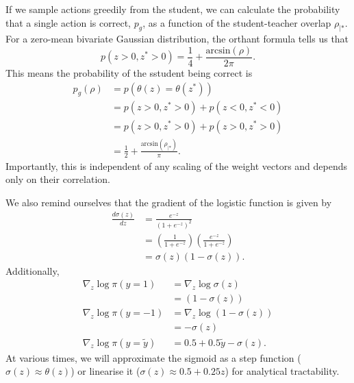 \documentclass{article}
\begin{document}
If we sample actions greedily from the student, we can calculate the probability that a single action is correct, $p_g$, as a function of the student-teacher overlap $\rho_{| *}$.
For a zero-mean bivariate Gaussian distribution, the orthant formula tells us that
\begin{equation}
    p(z >0, z^* > 0) = \frac{1}{4} + \frac{\text{arcsin}(\rho)}{2 \pi}.
\end{equation}
This means the probability of the sstudent being correct is
\begin{align}
    p_g(\rho) &= p(\theta(z) = \theta(z^*))\\
    &= p(z >0, z^* > 0) + p(z < 0, z^* < 0)\\
    &= p(z >0, z^* > 0) + p(z >0, z^* > 0)\\
    &= \frac{1}{2} + \frac{\text{arcsin}(\rho_{|*})}{\pi}. \label{eq:pg}
\end{align}
Importantly, this is independent of any scaling of the weight vectors and depends only on their correlation.

We also remind ourselves that the gradient of the logistic function is given by
\begin{align}
    \frac{d \sigma (z)}{dz} &= \frac{e^{-z}}{(1 + e^{-z})^2}\\
    &= \left ( \frac{1}{1 + e^{-z}} \right ) \left ( \frac{e^{-z}}{1 + e^{-z}} \right ) \\
    &= \sigma(z) (1 - \sigma(z)).
\end{align}
Additionally,
\begin{align}
    \nabla_z \log \pi(y = 1) &= \nabla_z \log \sigma(z)\\
    &= (1 - \sigma (z))\\
    \nabla_z \log \pi (y = -1) &= \nabla_z \log (1 - \sigma(z))\\
    &= - \sigma (z)\\
    \nabla_z \log \pi (y = \tilde{y}) &= 0.5 + 0.5 \tilde{y} - \sigma(z).
\end{align}
At various times, we will approximate the sigmoid as a step function ($\sigma(z) \approx \theta (z)$) or linearise it ($\sigma(z) \approx 0.5 + 0.25 z$) for analytical tractability.
\end{document}

